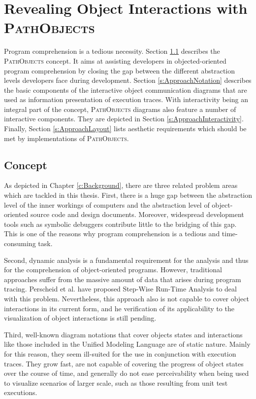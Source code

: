\chapter{Revealing Object Interactions with \textsc{PathObjects}}
\label{c:approach}
Program comprehension is a tedious necessity.
Section \ref{s:ApproachConcept} describes the \textsc{PathObjects} concept.
It aims at assisting developers in objected-oriented program comprehension by closing the gap between the different abstraction levels developers face during development.
Section \ref{s:ApproachNotation} describes the basic components of the interactive object communication diagrams that are used as information presentation of execution traces.
With interactivity being an integral part of the concept, \textsc{PathObjects} diagrams also feature a number of interactive components.
They are depicted in Section \ref{s:ApproachInteractivity}.
Finally, Section \ref{s:ApproachLayout} lists aesthetic requirements which should be met by implementations of \textsc{PathObjects}.

\section{Concept}
\label{s:ApproachConcept}
As depicted in Chapter \ref{c:Background}, there are three related problem areas which are tackled in this thesis.
First, there is a huge gap between the abstraction level of the inner workings of computers and the abstraction level of object-oriented source code and design documents.
Moreover, widespread development tools such as symbolic debuggers contribute little to the bridging of this gap.
This is one of the reasons why program comprehension is a tedious and time-consuming task.

Second, dynamic analysis is a fundamental requirement for the analysis and thus for the comprehension of object-oriented programs.
However, traditional approaches suffer from the massive amount of data that arises during program tracing.
Perscheid et al. have proposed Step-Wise Run-Time Analysis to deal with this problem.
Nevertheless, this approach also is not capable to cover object interactions in its current form, and he verification of its applicability to the visualization of object interactions is still pending.

Third, well-known diagram notations that cover objects states and interactions like those included in the Unified Modeling Language are of static nature.
Mainly for this reason, they seem ill-suited for the use in conjunction with execution traces.
They grow fast, are not capable of covering the progress of object states over the course of time, and generally do not ease perceivability when being used to visualize scenarios of larger scale, such as those resulting from unit test executions.

